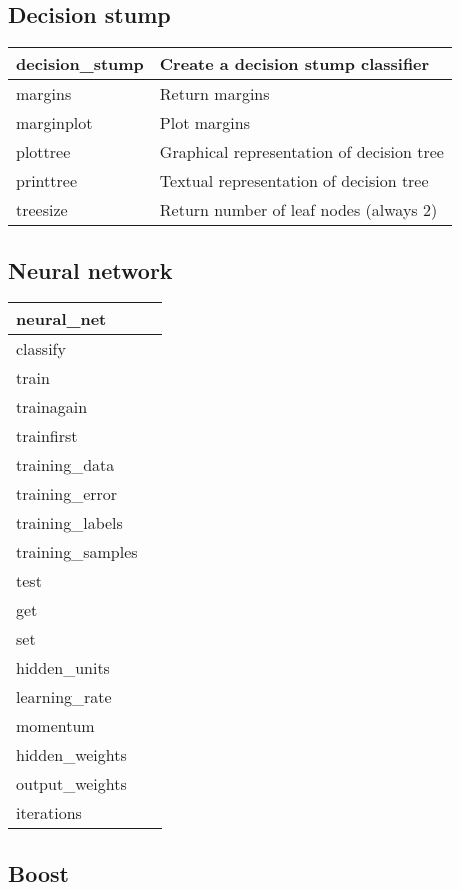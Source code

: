 \subsection{Decision stump}

\begin{tabular}{ll}
\hline
decision\_stump		& Create a decision stump classifier \\
\hline
margins			& Return margins \\
marginplot		& Plot margins \\
\hline
plottree		& Graphical representation of decision tree \\
printtree		& Textual representation of decision tree \\
treesize		& Return number of leaf nodes (always 2) \\
\hline
\end{tabular}

\subsection{Neural network}

\begin{tabular}{ll}
\hline
neural\_net		& \\
\hline
classify		& \\
\hline
train			& \\
trainagain		& \\
trainfirst		& \\
training\_data		& \\
training\_error		& \\
training\_labels	& \\
training\_samples	& \\
\hline
test			& \\
\hline
get			& \\
set			& \\
\hline
hidden\_units		& \\
learning\_rate		& \\
momentum		& \\
\hline
hidden\_weights		& \\
output\_weights		& \\
iterations		& \\
\hline
\end{tabular}

\subsection{Boost}


